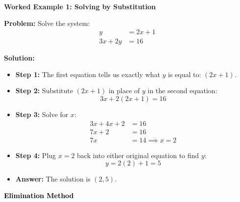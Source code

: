 \documentclass[12pt, letterpaper, fleqn]{article}
\begin{document}
\begin{tcolorbox}[colback=white, colframe=black!25, boxrule=0.6pt, arc=4mm, left=6mm, right=6mm, top=5mm, bottom=5mm]

\textbf{Worked Example 1: Solving by Substitution}

\medskip

\textbf{Problem:} Solve the system:
\begin{align*}
    y &= 2x + 1 \\
    3x + 2y &= 16
\end{align*}

\medskip

\textbf{Solution:}
\begin{itemize}
    \item \textbf{Step 1:} The first equation tells us exactly what $y$ is equal to: $(2x + 1)$.
    \item \textbf{Step 2:} Substitute $(2x + 1)$ in place of $y$ in the second equation:
    \[ 3x + 2(2x + 1) = 16 \]
    \item \textbf{Step 3:} Solve for $x$:
    \begin{align*}
        3x + 4x + 2 &= 16 \\
        7x + 2 &= 16 \\
        7x &= 14 \implies x = 2
    \end{align*}
    \item \textbf{Step 4:} Plug $x=2$ back into either original equation to find $y$:
    \[ y = 2(2) + 1 = 5 \]
    \item \textbf{Answer:} The solution is $(2, 5)$.
\end{itemize}

\end{tcolorbox}

\vspace{4mm}

\begin{tcolorbox}[colback=customteal!20]
\large\textcolor{black}{\textbf{Elimination Method}}
\end{tcolorbox}
\end{document}

